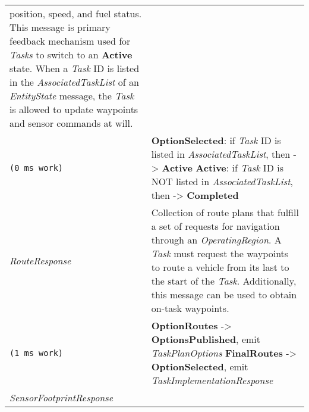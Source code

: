 \begin{longtable}[c]{@{}ll@{}}
\begin{minipage}[t]{0.65\columnwidth}
position, speed, and fuel status. This message is primary feedback
mechanism used for \emph{Tasks} to switch to an \textbf{Active} state.
When a \emph{Task} ID is listed in the \emph{AssociatedTaskList} of an
\emph{EntityState} message, the \emph{Task} is allowed to update
waypoints and sensor commands at will.
\strut\end{minipage}\tabularnewline
\begin{minipage}[t]{0.29\columnwidth}\raggedright\strut
\begin{verbatim}
(0 ms work)
\end{verbatim}
\strut\end{minipage} &
\begin{minipage}[t]{0.65\columnwidth}\raggedright\strut
\textbf{OptionSelected}: if \emph{Task} ID is listed in
\emph{AssociatedTaskList}, then -\textgreater{} \textbf{Active}
\textbf{Active}: if \emph{Task} ID is NOT listed in
\emph{AssociatedTaskList}, then -\textgreater{} \textbf{Completed}
\strut\end{minipage}\tabularnewline
\begin{minipage}[t]{0.29\columnwidth}\raggedright\strut
\emph{RouteResponse}
\strut\end{minipage} &
\begin{minipage}[t]{0.65\columnwidth}\raggedright\strut
Collection of route plans that fulfill a set of requests for navigation
through an \emph{OperatingRegion}. A \emph{Task} must request the
waypoints to route a vehicle from its last to the start of the
\emph{Task}. Additionally, this message can be used to obtain on-task
waypoints.
\strut\end{minipage}\tabularnewline
\begin{minipage}[t]{0.29\columnwidth}\raggedright\strut
\begin{verbatim}
(1 ms work)
\end{verbatim}
\strut\end{minipage} &
\begin{minipage}[t]{0.65\columnwidth}\raggedright\strut
\textbf{OptionRoutes} -\textgreater{} \textbf{OptionsPublished}, emit
\emph{TaskPlanOptions} \textbf{FinalRoutes} -\textgreater{}
\textbf{OptionSelected}, emit \emph{TaskImplementationResponse}
\strut\end{minipage}\tabularnewline
\begin{minipage}[t]{0.29\columnwidth}\raggedright\strut
\emph{SensorFootprintResponse}
\strut\end{minipage} &
\begin{minipage}[t]{0.65\columnwidth}\raggedright\strut

\end{minipage}
\end{longtable}
